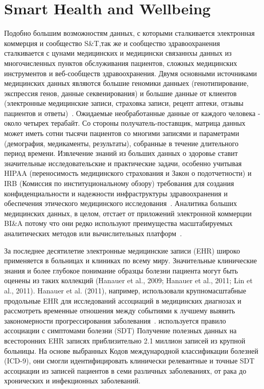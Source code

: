 \section{Smart Health and Wellbeing}
Подобно большим возможностям данных, с которыми сталкивается электронная коммерция и сообщество S\&T,так же и сообщество здравоохранения сталкивается с
цунами медицинских и медицински связаннхы данных из многочисленных пунктов обслуживания пациентов, сложных
медицинских инструментов и веб-сообществ здравоохранения.
Двумя основными источниками медицинских данных являются большие геномики данныех (генотипирование, экспрессия генов, данные секвенирования) и
большие данные от клиентов (электронные медицинские записи, страховка
записи, рецепт аптеки, отзывы пациентов и
ответы)~\cite{Miller:2012a}. Ожидаемые необработанные данные
от каждого человека - около четырех терабайт. Со стороны получатель-поставщик, матрица данных может иметь сотни
тысячи пациентов со многими записями и параметрами
(демография, медикаменты, результаты), собранные в течение длительного
период времени. Извлечение знаний из больших данных о здоровье
ставит значительные исследовательские и практические задачи, особенно
учитывая HIPAA (переносимость медицинского страхования и
Закон о подотчетности) и IRB (Комиссия по институциональному обзору)
требования для создания конфиденциальности и надежности
инфраструктуры здравоохранения и обеспечения этического медицинского
исследования~\cite{Gelfand:2012}. Аналитика больших медицинских данных,
в целом, отстает от приложений электронной коммерции BI\&A
потому что они редко используют преимущества масштабируемых аналитических
методов или вычислительных платформ~\cite{Miller:2012a}.

За последнее десятилетие электронные медицинские записи (EHR)
широко применяется в больницах и клиниках по всему миру.
Значительные клинические знания и более глубокое понимание
образцы болезни пациента могут быть оценены из таких коллекций
(Hanauer et al., 2009; Hanauer et al., 2011; Lin et al., 2011).
Hanauer et al. (2011), например, использовали крупномасштабные продольные
EHR для исследований ассоциаций в медицинских диагнозах
и рассмотреть временные отношения между событиями к лучшему
выявить закономерности прогрессирования заболевания~\cite{Lin:2011}.
используется правило ассоциации с симптомами болезни (SDT)
Получение полезных данных на всесторонних EHR записях приблизительно 2.1
миллион записей из крупной больницы. На основе выбранных
Кодов международной классификации болезней (ICD-9), они
смогли идентифицировать клинически релевантные и точные SDT
ассоциации из записей пациентов в семи различных заболеваниях,
от рака до хронических и инфекционных заболеваний.

